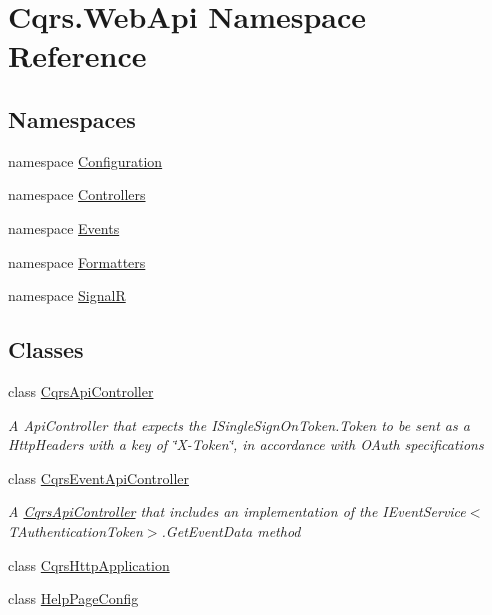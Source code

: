 \hypertarget{namespaceCqrs_1_1WebApi}{}\section{Cqrs.\+Web\+Api Namespace Reference}
\label{namespaceCqrs_1_1WebApi}
\subsection*{Namespaces}
\begin{DoxyCompactItemize}
\item 
namespace \hyperlink{namespaceCqrs_1_1WebApi_1_1Configuration}{Configuration}
\item 
namespace \hyperlink{namespaceCqrs_1_1WebApi_1_1Controllers}{Controllers}
\item 
namespace \hyperlink{namespaceCqrs_1_1WebApi_1_1Events}{Events}
\item 
namespace \hyperlink{namespaceCqrs_1_1WebApi_1_1Formatters}{Formatters}
\item 
namespace \hyperlink{namespaceCqrs_1_1WebApi_1_1SignalR}{SignalR}
\end{DoxyCompactItemize}
\subsection*{Classes}
\begin{DoxyCompactItemize}
\item 
class \hyperlink{classCqrs_1_1WebApi_1_1CqrsApiController}{Cqrs\+Api\+Controller}
\begin{DoxyCompactList}\small\item\em A Api\+Controller that expects the I\+Single\+Sign\+On\+Token.\+Token to be sent as a Http\+Headers with a key of \char`\"{}\+X-\/\+Token\char`\"{}, in accordance with O\+Auth specifications \end{DoxyCompactList}\item 
class \hyperlink{classCqrs_1_1WebApi_1_1CqrsEventApiController}{Cqrs\+Event\+Api\+Controller}
\begin{DoxyCompactList}\small\item\em A \hyperlink{classCqrs_1_1WebApi_1_1CqrsApiController}{Cqrs\+Api\+Controller} that includes an implementation of the I\+Event\+Service$<$\+T\+Authentication\+Token$>$.\+Get\+Event\+Data method \end{DoxyCompactList}\item 
class \hyperlink{classCqrs_1_1WebApi_1_1CqrsHttpApplication}{Cqrs\+Http\+Application}
\item 
class \hyperlink{classCqrs_1_1WebApi_1_1HelpPageConfig}{Help\+Page\+Config}
\end{DoxyCompactItemize}
